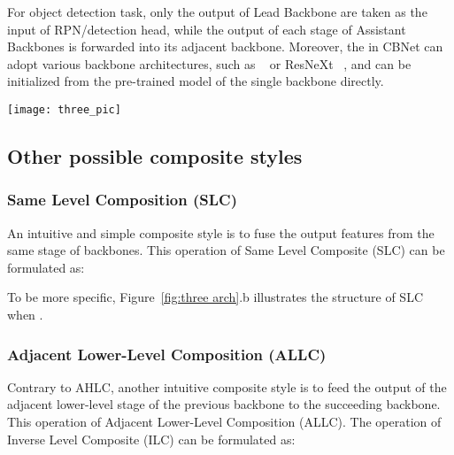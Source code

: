 \documentclass[letterpaper]{article} \usepackage{aaai20}  \usepackage{multirow}
\begin{document}
For object detection task, only the output of Lead Backbone  are taken as the input of RPN/detection head, while the output of each stage of Assistant Backbones is forwarded into its adjacent backbone. Moreover, the  in CBNet can adopt various backbone architectures, such as ~\cite{he2016deep} or ResNeXt ~\cite{xie2017aggregated}, and can be initialized from the pre-trained model of the single backbone directly.







\begin{figure*}[t]
	\centering
	\texttt{[image: three\_pic]}
	\caption{Four kinds of composite styles for Dual-Backbone architecture (an Assistant Backbone and a Lead Backbone). (a) Adjacent Higher-Level Composition (AHLC). (b) Same Level Composition (SLC). (c) Adjacent Lower-Level Composition (ALLC). (d) Dense Higher-Level Composition (DHLC). The composite connection denotes in blue boxes represents some simple operations, \textit{i.e.}, element-wise operation, scaling, 11 Conv layer and bn layer.
	}
	\label{fig:three arch}
\end{figure*}

\subsection{Other possible composite styles}
\label{sec:opcab}

\subsubsection{Same Level Composition (SLC)} 
An intuitive and simple composite style is to fuse the output features from the same stage of backbones. This operation of Same Level Composite (SLC) can be formulated as:

To be more specific, Figure~\ref{fig:three arch}.b illustrates the structure of SLC when .

\subsubsection{Adjacent Lower-Level Composition (ALLC)} 
Contrary to AHLC, another intuitive composite style is to feed the output of the adjacent lower-level stage of the previous backbone to the succeeding backbone. This operation of Adjacent Lower-Level Composition (ALLC). The operation of Inverse Level Composite (ILC) can be formulated as:
\end{document}
